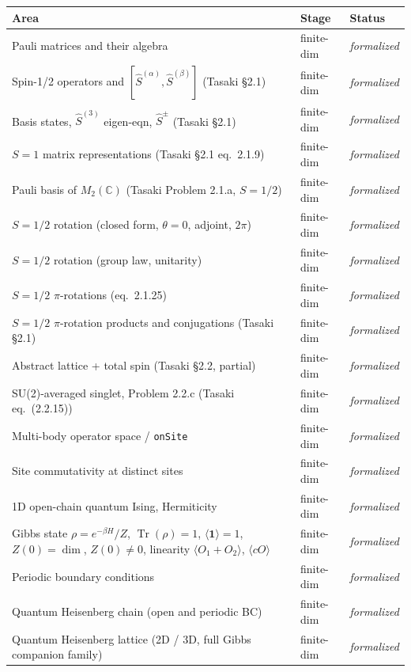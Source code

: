 \documentclass[a4paper,11pt]{article}
\begin{document}
\begin{center}
\begin{tabular}{lll}
\hline
Area & Stage & Status \\
\hline
Pauli matrices and their algebra & finite-dim & \emph{formalized} \\
Spin-1/2 operators and $[\hat S^{(\alpha)},\hat S^{(\beta)}]$ (Tasaki §2.1) & finite-dim & \emph{formalized} \\
Basis states, $\hat S^{(3)}$ eigen-eqn, $\hat S^\pm$ (Tasaki §2.1) & finite-dim & \emph{formalized} \\
$S = 1$ matrix representations (Tasaki §2.1 eq.~2.1.9) & finite-dim & \emph{formalized} \\
Pauli basis of $M_2(\mathbb{C})$ (Tasaki Problem 2.1.a, $S=1/2$) & finite-dim & \emph{formalized} \\
$S = 1/2$ rotation (closed form, $\theta=0$, adjoint, $2\pi$) & finite-dim & \emph{formalized} \\
$S = 1/2$ rotation (group law, unitarity) & finite-dim & \emph{formalized} \\
$S = 1/2$ $\pi$-rotations (eq.~2.1.25) & finite-dim & \emph{formalized} \\
$S = 1/2$ $\pi$-rotation products and conjugations (Tasaki §2.1) & finite-dim & \emph{formalized} \\
Abstract lattice + total spin (Tasaki §2.2, partial) & finite-dim & \emph{formalized} \\
SU(2)-averaged singlet, Problem 2.2.c (Tasaki eq.~(2.2.15)) & finite-dim & \emph{formalized} \\
Multi-body operator space / \texttt{onSite} & finite-dim & \emph{formalized} \\
Site commutativity at distinct sites & finite-dim & \emph{formalized} \\
1D open-chain quantum Ising, Hermiticity & finite-dim & \emph{formalized} \\
Gibbs state $\rho = e^{-\beta H}/Z$, $\operatorname{Tr}(\rho)=1$, $\langle\mathbf{1}\rangle=1$, $Z(0)=\dim$, $Z(0)\neq 0$, linearity $\langle O_1+O_2\rangle$, $\langle cO\rangle$ & finite-dim & \emph{formalized} \\
Periodic boundary conditions & finite-dim & \emph{formalized} \\
Quantum Heisenberg chain (open and periodic BC) & finite-dim & \emph{formalized} \\
Quantum Heisenberg lattice (2D / 3D, full Gibbs companion family) & finite-dim & \emph{formalized} \\

\end{tabular}
\end{center}
\end{document}
